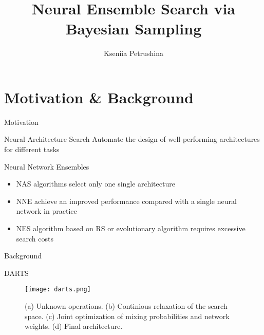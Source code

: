 \documentclass{beamer}
\title{Neural Ensemble Search via Bayesian Sampling}
\author{Kseniia Petrushina}
\institute{MIPT, 2024}
\begin{document}
\begin{frame}
    \titlepage
\end{frame}


\begin{frame}
    \tableofcontents
\end{frame}


\section{Motivation \& Background}
\begin{frame}{Motivation}
    \begin{block}{Neural Architecture Search}
    Automate the design of well-performing architectures for different tasks
    \end{block}
    
    \begin{block}{Neural Network Ensembles}
    \begin{itemize}
        \item NAS algorithms select only one single architecture
        \item NNE achieve an improved performance compared with a single neural network in practice
        \item NES algorithm based on RS or evolutionary algorithm requires excessive search costs
    \end{itemize}
    \end{block} 
\end{frame}

\begin{frame}{Background}
    \begin{block}{DARTS}
    \begin{figure}
        \centering
        \texttt{[image: darts.png]}
        \caption{(a) Unknown operations. (b) Continious relaxation of the search space. (c) Joint optimization of mixing probabilities and network weights. (d) Final architecture.}
        \label{fig:darts}
    \end{figure}
        
    \end{block}
\end{frame}
\end{document}
